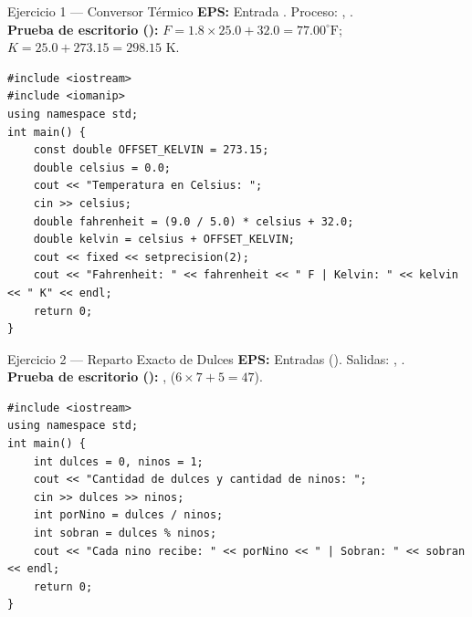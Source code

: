 \documentclass[11pt,letterpaper]{article}
\begin{document}
\begin{solucion}{Ejercicio 1 --- Conversor Térmico}
\textbf{EPS:} Entrada . Proceso: , .\\
\textbf{Prueba de escritorio ():} $F = 1.8 \times 25.0 + 32.0 = 77.00^\circ\text{F}$; $K = 25.0 + 273.15 = 298.15\text{ K}$.
\end{solucion}
\begin{lstlisting}[style=cppmonitoria]
#include <iostream>
#include <iomanip>
using namespace std;
int main() {
    const double OFFSET_KELVIN = 273.15;
    double celsius = 0.0;
    cout << "Temperatura en Celsius: ";
    cin >> celsius;
    double fahrenheit = (9.0 / 5.0) * celsius + 32.0;
    double kelvin = celsius + OFFSET_KELVIN;
    cout << fixed << setprecision(2);
    cout << "Fahrenheit: " << fahrenheit << " F | Kelvin: " << kelvin << " K" << endl;
    return 0;
}
\end{lstlisting}

\begin{solucion}{Ejercicio 2 --- Reparto Exacto de Dulces}
\textbf{EPS:} Entradas  (). Salidas: , .\\
\textbf{Prueba de escritorio ():} ,  ($6 \times 7 + 5 = 47$).
\end{solucion}
\begin{lstlisting}[style=cppmonitoria]
#include <iostream>
using namespace std;
int main() {
    int dulces = 0, ninos = 1;
    cout << "Cantidad de dulces y cantidad de ninos: ";
    cin >> dulces >> ninos;
    int porNino = dulces / ninos;
    int sobran = dulces % ninos;
    cout << "Cada nino recibe: " << porNino << " | Sobran: " << sobran << endl;
    return 0;
}
\end{lstlisting}
\end{document}
